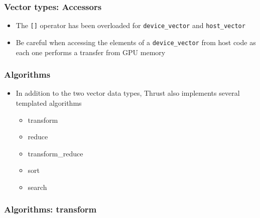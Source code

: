 \subsubsection{Vector types: Accessors}\label{vector-types-accessors}

\begin{itemize}
\itemsep1pt\parskip0pt
\item
  The \texttt{{[}{]}} operator has been overloaded for
  \texttt{device\_vector} and \texttt{host\_vector}
\end{itemize}

\begin{Shaded}
\begin{Highlighting}[]
\NormalTok{,}\NormalTok{);}
\NormalTok{D[}\NormalTok{] = }\NormalTok{; }
\NormalTok{D[}\NormalTok{] = }\NormalTok{;}
\end{Highlighting}
\end{Shaded}

\begin{itemize}
\itemsep1pt\parskip0pt
\item
  Be careful when accessing the elements of a \texttt{device\_vector}
  from host code as each one performs a transfer from GPU memory
\end{itemize}

\subsubsection{Algorithms}\label{algorithms-1}

\begin{itemize}
\itemsep1pt\parskip0pt
\item
  In addition to the two vector data types, Thrust also implements
  several templated algorithms

  \begin{itemize}
  \itemsep1pt\parskip0pt
  \item
    transform
  \item
    reduce
  \item
    transform\_reduce
  \item
    sort
  \item
    search
  \end{itemize}
\end{itemize}

\subsubsection{Algorithms: transform}\label{algorithms-transform}

